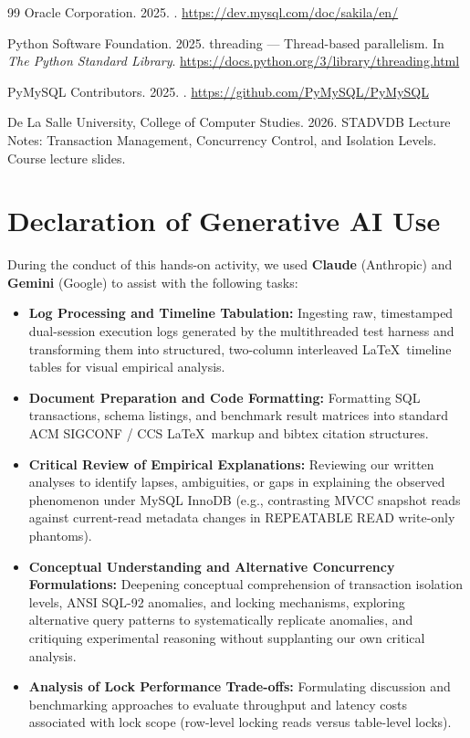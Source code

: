 \documentclass[sigconf, pbalance, nonacm]{acmart}
\begin{document}
\begin{thebibliography}{99}
Oracle Corporation. 2025.
.
\newblock \url{https://dev.mysql.com/doc/sakila/en/}

Python Software Foundation. 2025.
\newblock threading --- Thread-based parallelism. In {\em The Python Standard Library}.
\newblock \url{https://docs.python.org/3/library/threading.html}

PyMySQL Contributors. 2025.
.
\newblock \url{https://github.com/PyMySQL/PyMySQL}

De La Salle University, College of Computer Studies. 2026.
\newblock STADVDB Lecture Notes: Transaction Management, Concurrency Control, and Isolation Levels.
\newblock Course lecture slides.

\end{thebibliography}

\section{Declaration of Generative AI Use}
During the conduct of this hands-on activity, we used \textbf{Claude} (Anthropic) and \textbf{Gemini} (Google) to assist with the following tasks:
\begin{itemize}
    \item \textbf{Log Processing and Timeline Tabulation:} Ingesting raw, timestamped dual-session execution logs generated by the multithreaded test harness and transforming them into structured, two-column interleaved \LaTeX\ timeline tables for visual empirical analysis.
    \item \textbf{Document Preparation and Code Formatting:} Formatting SQL transactions, schema listings, and benchmark result matrices into standard ACM SIGCONF / CCS \LaTeX\ markup and bibtex citation structures.
    \item \textbf{Critical Review of Empirical Explanations:} Reviewing our written analyses to identify lapses, ambiguities, or gaps in explaining the observed phenomenon under MySQL InnoDB (e.g., contrasting MVCC snapshot reads against current-read metadata changes in REPEATABLE READ write-only phantoms).
    \item \textbf{Conceptual Understanding and Alternative Concurrency Formulations:} Deepening conceptual comprehension of transaction isolation levels, ANSI SQL-92 anomalies, and locking mechanisms, exploring alternative query patterns to systematically replicate anomalies, and critiquing experimental reasoning without supplanting our own critical analysis.
    \item \textbf{Analysis of Lock Performance Trade-offs:} Formulating discussion and benchmarking approaches to evaluate throughput and latency costs associated with lock scope (row-level locking reads versus table-level locks).
\end{itemize}
\end{document}
